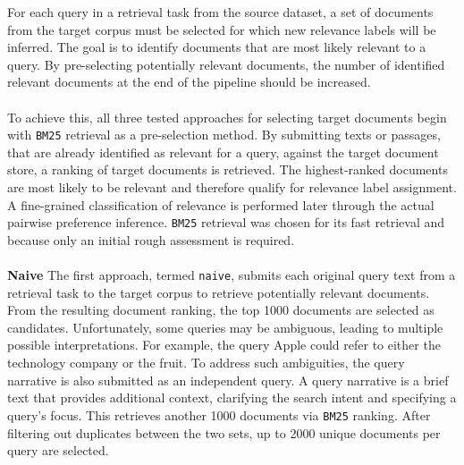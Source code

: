 For each query in a retrieval task from the source dataset, a set of documents from the target corpus must be selected for which new relevance labels will be inferred. The goal is to identify documents that are most likely relevant to a query. By pre-selecting potentially relevant documents, the number of identified relevant documents at the end of the pipeline should be increased.
\\\\
To achieve this, all three tested approaches for selecting target documents begin with \texttt{BM25} retrieval as a pre-selection method. By submitting texts or passages, that are already identified as relevant for a query, against the target document store, a ranking of target documents is retrieved. The highest-ranked documents are most likely to be relevant and therefore qualify for relevance label assignment. A fine-grained classification of relevance is performed later through the actual pairwise preference inference. \texttt{BM25} retrieval was chosen for its fast retrieval and because only an initial rough assessment is required.
\\\\
\textbf{Naive} The first approach, termed \texttt{naive}, submits each original query text from a retrieval task to the target corpus to retrieve potentially relevant documents. From the resulting document ranking, the top 1000 documents are selected as candidates. Unfortunately, some queries may be ambiguous, leading to multiple possible interpretations. For example, the query \glqq Apple\grqq{} could refer to either the technology company or the fruit. To address such ambiguities, the query narrative is also submitted as an independent query. A query narrative is a brief text that provides additional context, clarifying the search intent and specifying a query's focus. This retrieves another 1000 documents via \texttt{BM25} ranking. After filtering out duplicates between the two sets, up to 2000 unique documents per query are selected.
\\\\
